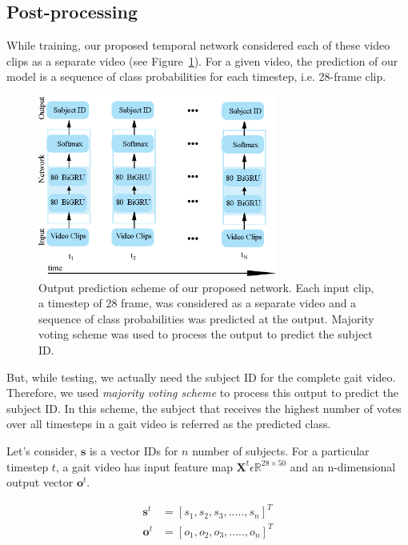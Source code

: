 \subsection{Post-processing}\label{subsec_post_process}
While training, our proposed temporal network considered each of these video clips as a separate video (see Figure~\ref{fig:output_prediction}). For a given video, the prediction of our model is a sequence of class probabilities for each timestep, i.e. 28-frame clip.

\begin{figure}
	\centering
	\includegraphics[width=0.7\textwidth ]{figures/output_prediction.eps}
	\caption[Output prediction scheme of our proposed network]{
		Output prediction scheme of our proposed network. Each input clip, a timestep of 28 frame, was considered as a separate video and a sequence of class probabilities was predicted at the output. Majority voting scheme was used to process the output to predict the subject ID.
	}
	\label{fig:output_prediction}
\end{figure}

But, while testing, we actually need the subject ID for the complete gait video. Therefore, we used \textit {majority voting scheme} to process this output to predict the subject ID. In this scheme, the subject that receives the highest number of votes over all timesteps in a  gait video is referred as the predicted class.

Let's consider, $\boldsymbol{s}$ is a vector IDs for $n$ number of subjects. For a particular timestep $t$, a gait video has input feature map $\boldsymbol X^t \epsilon \mathbb {R}^{28\times 50}$ and an n-dimensional output vector $\boldsymbol o^t$.

\begin{equation} \label{equ:timestep_sequence}
\begin{split}
\boldsymbol s^t &=  {[s_1, s_2, s_3, ....., s_{n}]}^{T}\\
\boldsymbol o^t &=  {[o_1, o_2, o_3, ....., o_{n}]}^{T}
\end{split}
\end{equation}

